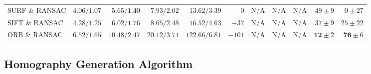 \begin{table}
\begin{adjustbox}{angle=90, max height=0.9\textheight}
\begin{tabular}{lrrrrrrrrrr}
        SURF \& RANSAC  & $4.06/1.07         $ & $ 5.65/1.40         $ & $ 7.93/2.02         $ & $ 13.62/3.39                  $ & $   0         $ & N/A     & N/A     &  N/A                & $49          \pm 9$ & $   0          \pm 27$ \\
        SIFT \& RANSAC  & $4.28/1.25         $ & $ 6.02/1.76         $ & $ 8.65/2.48         $ & $ 16.52/4.63                  $ & $- 37         $ & N/A     & N/A     &  N/A                & $37          \pm 9$ & $  25          \pm 22$ \\
        ORB \& RANSAC   & $6.52/1.65         $ & $10.48/2.47         $ & $20.12/3.71         $ & $122.66/6.81                  $ & $-101         $ & N/A     & N/A     &  N/A                & $\mathbf{12} \pm 2$ & $  \mathbf{76} \pm  6$ \\ \bottomrule
    \end{tabular}
\end{adjustbox}
\end{table}
\subsection{Homography Generation Algorithm}
\label{c2:sec:hom_opt}


